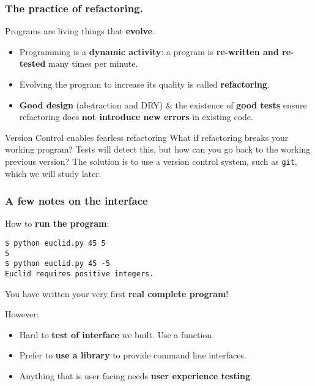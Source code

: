 \documentclass{beamer} %
\newcommand\emc[1]{\textcolor{midred}{\textbf{#1}}}
\begin{document}
\begin{frame}
\frametitle{The practice of refactoring.}

Programs are living things that \emc{evolve}.
\begin{itemize}
\item Programming is a \emc{dynamic activity}: a program is \emc{re-written and re-tested} many times per minute.
\item Evolving the program to increase its quality is called \emc{refactoring}.
\item \emc{Good design} (abstraction and DRY) \& the existence of \emc{good tests} ensure refactoring does \emc{not introduce new errors} in existing code.
\end{itemize}

\begin{block}{Version Control enables fearless refactoring}
What if refactoring breaks your working program? Tests will detect this, but how can you go back to the working previous version? The solution is to use a version control system, such as \texttt{git}, which we will study later.
\end{block}

\end{frame}


\begin{frame}[fragile]
\frametitle{A few notes on the interface}

How to \emc{run the program}:
\begin{center}
\begin{Verbatim}[fontsize=\scriptsize]
$ python euclid.py 45 5
5
$ python euclid.py 45 -5
Euclid requires positive integers.
\end{Verbatim}
\end{center}
You have written your very first \emc{real complete program}!

\vspace{3mm}
However:
\begin{itemize}
	\item Hard to \emc{test of interface} we built. Use a function.
	\item Prefer to \emc{use a library} to provide command line interfaces.
	\item Anything that is user facing needs \emc{user experience testing}.
\end{itemize}

\end{frame}


\end{document}
